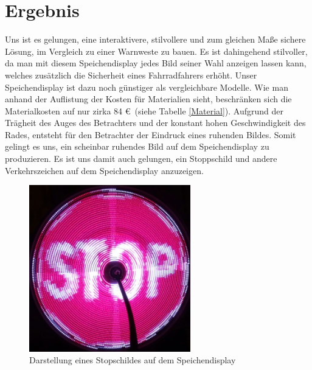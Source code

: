 \documentclass [a4paper, 11pt] {article}
\begin{document}
\section{Ergebnis}
Uns ist es gelungen, eine interaktivere, stilvollere und zum gleichen Maße sichere Lösung, im Vergleich zu einer Warnweste zu bauen. Es ist dahingehend stilvoller, da man mit diesem Speichendisplay jedes Bild seiner Wahl anzeigen lassen kann, welches zusätzlich die Sicherheit eines Fahrradfahrers erhöht.
Unser Speichendisplay ist dazu noch günstiger als vergleichbare Modelle. Wie man anhand der Auflistung der Kosten für Materialien sieht, beschränken sich die Materialkosten auf nur zirka 84 \euro\ (siehe Tabelle \ref{Material}). Aufgrund der Trägheit des Auges des Betrachters und der konstant hohen Geschwindigkeit des Rades, entsteht für den Betrachter der Eindruck eines ruhenden Bildes. Somit gelingt es uns, ein scheinbar ruhendes Bild auf dem Speichendisplay zu produzieren. Es ist uns damit auch gelungen, ein Stoppschild und andere Verkehrszeichen auf dem Speichendisplay anzuzeigen.
\begin{figure}[h]
	\centering
	\includegraphics[width=7cm]{Stopschild.png}
	\caption{Darstellung eines Stopschildes auf dem Speichendisplay}
\end{figure}
\end{document}
